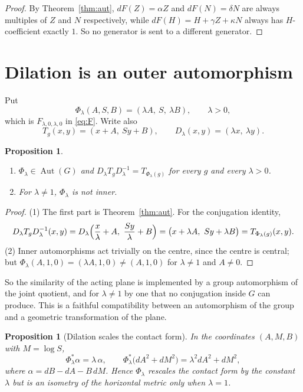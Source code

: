 \documentclass[11pt]{article}
\newtheorem{proposition}[theorem]{Proposition}
\begin{document}
\begin{proof}
By Theorem~\ref{thm:aut}, $dF(Z)=\alpha Z$ and $dF(N)=\delta N$ are always
multiples of $Z$ and $N$ respectively, while $dF(H)=H+\gamma Z+\kappa N$ always
has $H$-coefficient exactly $1$. So no generator is sent to a different
generator.
\end{proof}

\section{Dilation is an outer automorphism}
\label{sec:dilation}

Put
\[
\Phi_\lambda(A,S,B)=(\lambda A,\ S,\ \lambda B),\qquad \lambda>0,
\]
which is $F_{\lambda,0,\lambda,0}$ in \eqref{eq:F}. Write also
\[
T_g(x,y)=(x+A,\ Sy+B),\qquad D_\lambda(x,y)=(\lambda x,\ \lambda y).
\]

\begin{proposition}
\label{prop:dilation}
\leavevmode
\begin{enumerate}
\item $\Phi_\lambda\in\operatorname{Aut}(G)$ and
$D_\lambda T_gD_\lambda^{-1}=T_{\Phi_\lambda(g)}$ for every $g$ and every
$\lambda>0$.
\item For $\lambda\ne1$, $\Phi_\lambda$ is \emph{not} inner.
\end{enumerate}
\end{proposition}

\begin{proof}
(1) The first part is Theorem~\ref{thm:aut}. For the conjugation identity,
\[
D_\lambda T_gD_\lambda^{-1}(x,y)
=D_\lambda\Bigl(\frac x\lambda+A,\ \frac{Sy}\lambda+B\Bigr)
=\bigl(x+\lambda A,\ Sy+\lambda B\bigr)=T_{\Phi_\lambda(g)}(x,y).
\]
(2) Inner automorphisms act trivially on the centre, since the centre is central;
but $\Phi_\lambda(A,1,0)=(\lambda A,1,0)\ne(A,1,0)$ for $\lambda\ne1$ and
$A\ne0$.
\end{proof}

So the similarity of the acting plane is implemented by a group automorphism of
the joint quotient, and for $\lambda\ne1$ by one that no conjugation inside $G$
can produce. This is a faithful compatibility between an automorphism of the
group and a geometric transformation of the plane.

\begin{proposition}[Dilation scales the contact form]
\label{prop:conformal}
In the coordinates $(A,M,B)$ with $M=\log S$,
\[
\Phi_\lambda^*\alpha=\lambda\,\alpha,
\qquad
\Phi_\lambda^*\bigl(dA^2+dM^2\bigr)=\lambda^2dA^2+dM^2,
\]
where $\alpha=dB-dA-B\,dM$. Hence $\Phi_\lambda$ rescales the contact form by
the constant $\lambda$ but is an isometry of the horizontal metric only when
$\lambda=1$.
\end{proposition}
\end{document}
